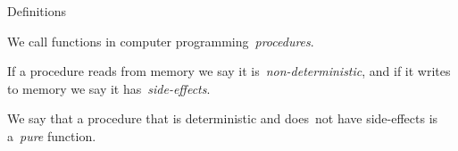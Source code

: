 \documentclass[notes]{beamer}
\begin{document}
\begin{frame}{Definitions}
    \begin{definition}[Procedure]
        We call functions in computer programming~\emph{procedures}.
    \end{definition}

    \pause

    \begin{definition}
        If a procedure reads from memory we say it is~\emph{non-deterministic},
        and if it writes to memory we say it has~\emph{side-effects}.

        We say that a procedure that is deterministic and does~\alert{not} have
        side-effects is a~\emph{pure} function.
    \end{definition}
\end{frame}
\end{document}

